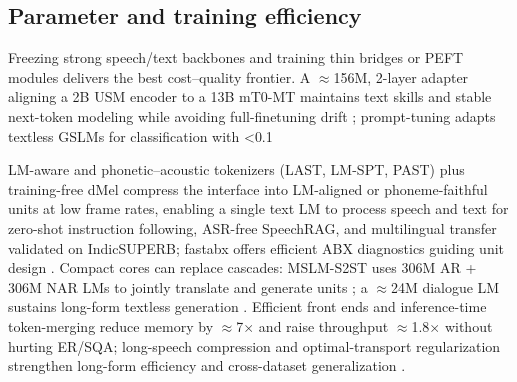 \documentclass{article}
\begin{document}
\subsection{Parameter and training efficiency} \label{subsec:Parameter and training efficiency}
Freezing strong speech/text backbones and training thin bridges or PEFT modules delivers the best cost--quality frontier. A $\approx$156M, 2-layer adapter aligning a 2B USM encoder to a 13B mT0-MT maintains text skills and stable next-token modeling while avoiding full-finetuning drift \cite{wang2023slmbridgethingapbetweenspeechtextfoundat}; prompt-tuning adapts textless GSLMs for classification with <0.1%

LM-aware and phonetic--acoustic tokenizers (LAST, LM-SPT, PAST) plus training-free dMel compress the interface into LM-aligned or phoneme-faithful units at low frame rates, enabling a single text LM to process speech and text for zero-shot instruction following, ASR-free SpeechRAG, and multilingual transfer validated on IndicSUPERB; fastabx offers efficient ABX diagnostics guiding unit design \cite{turetzky2024lastlanguagemodelawarespeechtokenization,jo2025lmsptalignedsemanticdistillationspeechto,har-tuv2025pastphoneticacousticspeechtokenizer,bai2025dmelspeechtokenizationmadesimple,min2025speechretrievalaugmentedgenerationwithou,poli2025fastabxlibraryefficientcomputationabxdis,entry2025indicsuperbspeechprocessinguniversalperf,vashishth2024stabspeechtokenizerassessmentbenchmark}. Compact cores can replace cascades: MSLM-S2ST uses 306M AR + 306M NAR LMs to jointly translate and generate units \cite{peng2024mslms2stmultitaskspeechlanguagemodeltext}; a $\approx$24M dialogue LM sustains long-form textless generation \cite{nakata2024jchatjapaneselargescalespokendialoguecor}. Efficient front ends and inference-time token-merging reduce memory by $\approx$7$\times$ and raise throughput $\approx$1.8$\times$ without hurting ER/SQA; long-speech compression and optimal-transport regularization strengthen long-form efficiency and cross-dataset generalization \cite{lu2024fastadaspmultitaskadaptedefficientinfere,guo2025fastlongspeechenhancinglargespeechlangua,xu2025optimaltransportregularizationspeechtext}.
\end{document}
